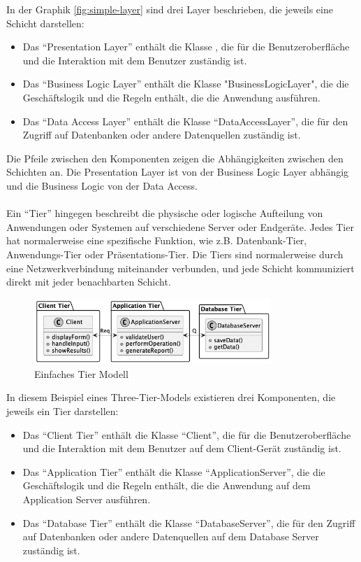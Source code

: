 In der Graphik \ref{fig:simple-layer} sind drei Layer beschrieben, die jeweils eine Schicht darstellen:
\begin{itemize}
\item Das \enquote{Presentation Layer} enthält die Klasse , die für die Benutzeroberfläche und die Interaktion mit dem Benutzer zuständig ist.

\item Das \enquote{Business Logic Layer} enthält die Klasse "BusinessLogicLayer", die die Geschäftslogik und die Regeln enthält, die die Anwendung ausführen.

\item Das \enquote{Data Access Layer} enthält die Klasse \enquote{DataAccessLayer}, die für den Zugriff auf Datenbanken oder andere Datenquellen zuständig ist.
\end{itemize}
Die Pfeile zwischen den Komponenten zeigen die Abhängigkeiten zwischen den Schichten an. Die Presentation Layer ist von der Business Logic Layer abhängig und die Business Logic von der Data Access.
\\\\
Ein \enquote{Tier} hingegen beschreibt die physische oder logische Aufteilung von Anwendungen oder Systemen auf verschiedene Server oder Endgeräte. Jedes Tier hat normalerweise eine spezifische Funktion, wie z.B. Datenbank-Tier, Anwendungs-Tier oder Präsentations-Tier. Die Tiers sind normalerweise durch eine Netzwerkverbindung miteinander verbunden, und jede Schicht kommuniziert direkt mit jeder benachbarten Schicht.
\begin{figure}[!h]
  \centering
  \includegraphics[width=0.80\textwidth]{fig/uml/simple-tiers.png}
  \caption{Einfaches Tier Modell}
  \label{fig:simple-tier}
\end{figure}
In diesem Beispiel eines Three-Tier-Models existieren drei Komponenten, die jeweils ein Tier darstellen:
\begin{itemize}
\item Das \enquote{Client Tier} enthält die Klasse \enquote{Client}, die für die Benutzeroberfläche und die Interaktion mit dem Benutzer auf dem Client-Gerät zuständig ist.

\item Das \enquote{Application Tier} enthält die Klasse \enquote{ApplicationServer}, die die Geschäftslogik und die Regeln enthält, die die Anwendung auf dem Application Server ausführen.

\item Das \enquote{Database Tier} enthält die Klasse \enquote{DatabaseServer}, die für den Zugriff auf Datenbanken oder andere Datenquellen auf dem Database Server zuständig ist.
\end{itemize}
